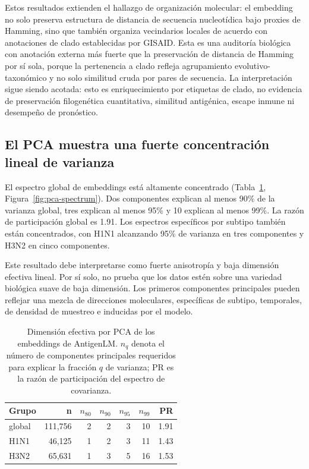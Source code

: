 \documentclass[11pt]{article}
\begin{document}
Estos resultados extienden el hallazgo de organización molecular: el embedding no solo preserva estructura de distancia de secuencia nucleotídica bajo proxies de Hamming, sino que también organiza vecindarios locales de acuerdo con anotaciones de clado establecidas por GISAID. Esta es una auditoría biológica con anotación externa más fuerte que la preservación de distancia de Hamming por sí sola, porque la pertenencia a clado refleja agrupamiento evolutivo-taxonómico y no solo similitud cruda por pares de secuencia. La interpretación sigue siendo acotada: esto es enriquecimiento por etiquetas de clado, no evidencia de preservación filogenética cuantitativa, similitud antigénica, escape inmune ni desempeño de pronóstico.

\subsection{El PCA muestra una fuerte concentración lineal de varianza}

El espectro global de embeddings está altamente concentrado (Tabla~\ref{tab:pca}, Figura~\ref{fig:pca-spectrum}). Dos componentes explican al menos 90\% de la varianza global, tres explican al menos 95\% y 10 explican al menos 99\%. La razón de participación global es 1.91. Los espectros específicos por subtipo también están concentrados, con H1N1 alcanzando 95\% de varianza en tres componentes y H3N2 en cinco componentes.

Este resultado debe interpretarse como fuerte anisotropía y baja dimensión efectiva lineal. Por sí solo, no prueba que los datos estén sobre una variedad biológica suave de baja dimensión. Los primeros componentes principales pueden reflejar una mezcla de direcciones moleculares, específicas de subtipo, temporales, de densidad de muestreo e inducidas por el modelo.

\begin{table}[H]
\centering
\caption{Dimensión efectiva por PCA de los embeddings de AntigenLM. $n_q$ denota el número de componentes principales requeridos para explicar la fracción $q$ de varianza; PR es la razón de participación del espectro de covarianza.}
\label{tab:pca}
\begin{tabular}{lrrrrrr}
\toprule
Grupo & n & $n_{80}$ & $n_{90}$ & $n_{95}$ & $n_{99}$ & PR \\
\midrule
global & 111,756 & 2 & 2 & 3 & 10 & 1.91 \\
H1N1 & 46,125 & 1 & 2 & 3 & 11 & 1.43 \\
H3N2 & 65,631 & 1 & 3 & 5 & 16 & 1.53 \\
\bottomrule
\end{tabular}
\end{table}
\end{document}
